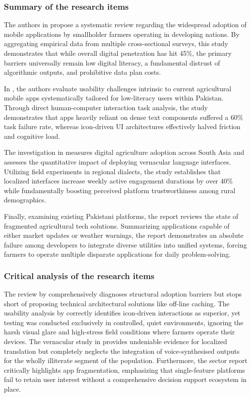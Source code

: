 \subsubsection{Summary of the research items}
The authors in \cite{hassan2022adoption} propose a systematic review regarding the widespread adoption of mobile applications by smallholder farmers operating in developing nations. By aggregating empirical data from multiple cross-sectional surveys, this study demonstrates that while overall digital penetration has hit 45\%, the primary barriers universally remain low digital literacy, a fundamental distrust of algorithmic outputs, and prohibitive data plan costs.

In \cite{rehman2023usability}, the authors evaluate usability challenges intrinsic to current agricultural mobile apps systematically tailored for low-literacy users within Pakistan. Through direct human-computer interaction task analysis, the study demonstrates that apps heavily reliant on dense text components suffered a 60\% task failure rate, whereas icon-driven UI architectures effectively halved friction and cognitive load.

The investigation in \cite{singh2021impact} measures digital agriculture adoption across South Asia and assesses the quantitative impact of deploying vernacular language interfaces. Utilizing field experiments in regional dialects, the study establishes that localized interfaces increase weekly active engagement durations by over 40\% while fundamentally boosting perceived platform trustworthiness among rural demographics.

Finally, examining existing Pakistani platforms, the \cite{pasha2024agritech} report reviews the state of fragmented agricultural tech solutions. Summarizing applications capable of either market updates or weather warnings, the report demonstrates an absolute failure among developers to integrate diverse utilities into unified systems, forcing farmers to operate multiple disparate applications for daily problem-solving.

\subsubsection{Critical analysis of the research items}
The review by \cite{hassan2022adoption} comprehensively diagnoses structural adoption barriers but stops short of proposing technical architectural solutions like off-line caching. The usability analysis by \cite{rehman2023usability} correctly identifies icon-driven interactions as superior, yet testing was conducted exclusively in controlled, quiet environments, ignoring the harsh visual glare and high-stress field conditions where farmers operate their devices. The vernacular study in \cite{singh2021impact} provides undeniable evidence for localized translation but completely neglects the integration of voice-synthesised outputs for the wholly illiterate segment of the population. Furthermore, the \cite{pasha2024agritech} sector report critically highlights app fragmentation, emphasizing that single-feature platforms fail to retain user interest without a comprehensive decision support ecosystem in place.

